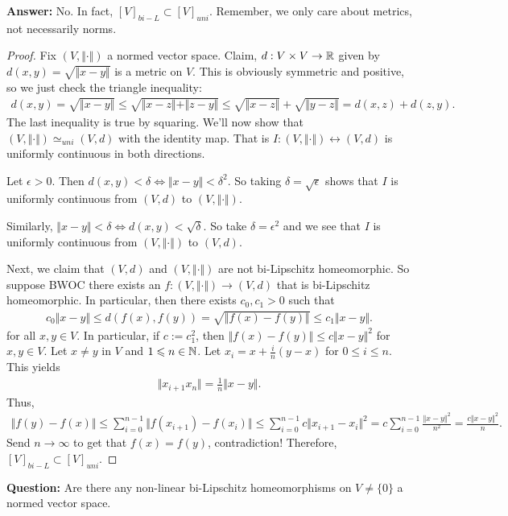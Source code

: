 \documentclass{report}
\begin{document}
\noindent \textbf{Answer:} No. In fact, $[V]_{bi-L} \subset [V]_{uni}$. Remember, we only care about metrics, not necessarily norms. 
\begin{proof}
    Fix $(V, \Vert \cdot \Vert)$ a normed vector space. Claim, $d: V \times V \to \RR$ given by $d(x, y) = \sqrt{\Vert x- y \Vert}$ is a metric on $V$. This is obviously symmetric and positive, so we just check the triangle inequality:
    \begin{align*}
        d(x, y) = \sqrt{\Vert x- y\Vert} \leq \sqrt{\Vert x - z \Vert + \Vert z - y\Vert} \leq \sqrt{\Vert x - z \Vert} + \sqrt{\Vert y - z \Vert} = d(x, z) + d(z, y).
    \end{align*}
    The last inequality is true by squaring. We'll now show that $(V, \Vert \cdot \Vert) \simeq_{uni} (V, d)$ with the identity map. That is $I: (V, \Vert \cdot \Vert) \leftrightarrow (V, d)$ is uniformly continuous in both directions.

    Let $\epsilon > 0$. Then $d(x, y) < \delta \iff \Vert x- y \Vert  < \delta^2$. So taking $\delta = \sqrt \epsilon$ shows that $I$ is uniformly continuous from $(V, d)$ to $(V, \Vert \cdot \Vert)$.

    Similarly, $\Vert x - y \Vert < \delta \iff d(x, y) < \sqrt{\delta}$. So take $\delta = \epsilon^2$ and we see that $I$ is uniformly continuous from $(V, \Vert \cdot \Vert)$ to $(V, d)$.

    Next, we claim that $(V, d)$ and $(V, \Vert \cdot \Vert)$ are not bi-Lipschitz homeomorphic. So suppose BWOC there exists an $f: (V, \Vert \cdot \Vert) \to (V, d)$ that is bi-Lipschitz homeomorphic. In particular, then there exists $c_0, c_1 > 0$ such that 
    \begin{align*}
       c_0 \Vert x- y \Vert \leq d(f(x), f(y)) = \sqrt{\Vert f(x) - f(y) \Vert} \leq c_1 \Vert x- y \Vert.
    \end{align*}
    for all $x,y \in V$. In particular, if $c:= c_1^2$, then $\Vert f(x) - f(y) \Vert \leq c \Vert x- y \Vert^2$ for $x,y \in V$. Let $x \neq y$ in $V$ and $1 \leq n \in \NN$. Let $x_i = x + \frac in (y - x)$ for $0 \leq i \leq n$. This yields 
    \begin{align*}
        \Vert x_{i+1} x_n \Vert = \frac{1}{n} \Vert x- y\Vert.
    \end{align*}
    Thus,
    \begin{align*}
        \Vert f(y) - f(x) \Vert \leq \sum_{i=0}^{n-1} \Vert f(x_{i+1}) - f(x_i) \Vert \leq \sum_{i=0}^{n-1} c \Vert x_{i+1} - x_i \Vert^2 = c\sum_{i=0}^{n-1} \frac{\Vert x - y\Vert^2}{n^2} = \frac{c \Vert x- y\Vert^2}{n}.
    \end{align*}
    Send $n \to \infty$ to get that $f(x) = f(y)$, contradiction! Therefore, $ [V]_{bi-L} \subset [V]_{uni}$.
\end{proof}
\noindent \textbf{Question:} Are there any non-linear bi-Lipschitz homeomorphisms on $V \neq \{ 0 \}$ a normed vector space. 
\end{document}
